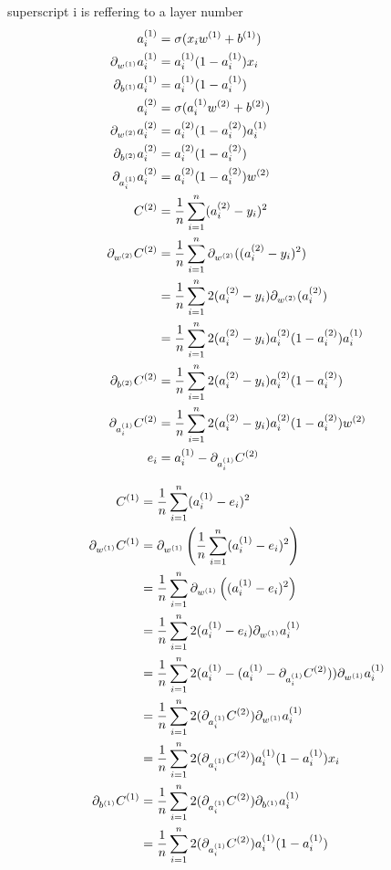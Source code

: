 \documentclass{article}
\begin{document}
superscript i is reffering to a layer number
\begin{align}
    a_i\s[1] &= \sigma(x_iw\s[1] + b\s[1]) \\
    \pd[{w\s[1]}]a_i\s[1] &= a_i\s[1](1 - a_i\s[1])x_i \\
    \pd[{b\s[1]}]a_i\s[1] &= a_i\s[1](1 - a_i\s[1]) \\
    a_i\s[2] &= \sigma(a_i\s[1]w\s[2] + b\s[2]) \\
    \pd[{w\s[2]}]a_i\s[2] &= a_i\s[2](1 - a_i\s[2])a_i\s[1] \\
    \pd[{b\s[2]}]a_i\s[2] &= a_i\s[2](1 - a_i\s[2]) \\
    \pd[{a_i\s[1]}]a_i\s[2] &= a_i\s[2](1 - a_i\s[2])w\s[2] \\
    C\s[2] &= \avgsum[i, n] (a_i\s[2] - y_i)^2 \\
    \pd[{w\s[2]}] C\s[2]
        &= \avgsum[i, n] \pd[{w\s[2]}]((a_i\s[2] - y_i)^2) \\
        &= \avgsum[i, n] 2(a_i\s[2] - y_i)\pd[{w\s[2]}](a_i\s[2]) \\
        &= \avgsum[i, n] 2(a_i\s[2] - y_i)a_i\s[2](1 - a_i\s[2])a_i\s[1] \\
    \pd[{b\s[2]}] C\s[2]
        &= \avgsum[i, n] 2(a_i\s[2] - y_i)a_i\s[2](1 - a_i\s[2]) \\
    \pd[{a_i\s[1]}] C\s[2]
        &= \avgsum[i, n] 2(a_i\s[2] - y_i)a_i\s[2](1 - a_i\s[2])w\s[2] \\
    e_i
        &= a_i\s[1] - \pd[{a_i\s[1]}]C\s[2]
\end{align}

\begin{align}
    C\s[1]
        &= \avgsum[i, n] (a_i\s[1] - e_i)^2 \\
    \pd[{w\s[1]}]C\s[1]
        &= \pd[{w\s[1]}]\left(\avgsum[i, n] (a_i\s[1] - e_i)^2\right) \\
        &= \avgsum[i, n] \pd[{w\s[1]}]\left((a_i\s[1] - e_i)^2\right) \\
        &= \avgsum[i, n] 2(a_i\s[1] - e_i) \pd[{w\s[1]}]a_i\s[1] \\
        &= \avgsum[i, n] 2(a_i\s[1] -(a_i\s[1] - \pd[{a_i\s[1]}]C\s[2])) \pd[{w\s[1]}]a_i\s[1] \\
        &= \avgsum[i, n] 2(\pd[{a_i\s[1]}]C\s[2]) \pd[{w\s[1]}]a_i\s[1] \\
        &= \avgsum[i, n] 2(\pd[{a_i\s[1]}]C\s[2]) a_i\s[1](1 - a_i\s[1])x_i \\
    \pd[{b\s[1]}]C\s[1]
        &= \avgsum[i, n] 2(\pd[{a_i\s[1]}]C\s[2]) \pd[{b\s[1]}]a_i\s[1] \\
        &= \avgsum[i, n] 2(\pd[{a_i\s[1]}]C\s[2]) a_i\s[1](1 - a_i\s[1])
\end{align}
\end{document}
